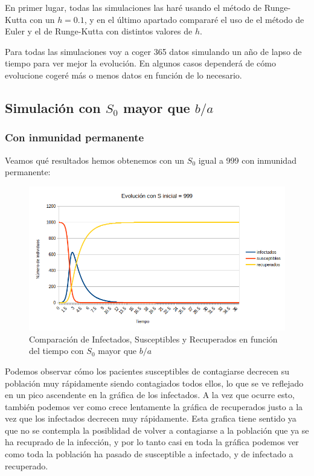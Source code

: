 \documentclass[11pt,a4paper]{report}
\begin{document}
En primer lugar, todas las simulaciones las haré usando el método de Runge-Kutta con un $h=0.1$, y en el último apartado compararé el uso de el método de Euler y el de Runge-Kutta con distintos valores de $h$.

Para todas las simulaciones voy a coger 365 datos simulando un año de lapso de tiempo para ver mejor la evolución. En algunos casos dependerá de cómo evolucione cogeré más o menos datos en función de lo necesario.

\newpage
\subsection{Simulación con $S_0$ mayor que $b/a$}
\subsubsection{Con inmunidad permanente}

Veamos qué resultados hemos obtenemos con un $S_0$ igual a 999 con inmunidad permanente:

\begin{figure}[H]
\centering
\includegraphics[width=\textwidth]{img/inmunidad/simulacion_ba_mayor.png}
\caption{Comparación de Infectados, Susceptibles y Recuperados en función del tiempo con $S_0$ mayor que $b/a$}
\label{}
\end{figure}

Podemos observar cómo los pacientes susceptibles de contagiarse decrecen su población muy rápidamente siendo contagiados todos ellos, lo que se ve reflejado en un pico ascendente en la gráfica de los infectados. A la vez que ocurre esto, también podemos ver como crece lentamente la gráfica de recuperados justo a la vez que los infectados decrecen muy rápidamente. Esta grafica tiene sentido ya que no se contempla la posiblidad de volver a contagiarse a la población que ya se ha recuprado de la infección, y por lo tanto casi en toda la gráfica podemos ver como toda la población ha pasado de susceptible a infectado, y de infectado a recuperado.
\end{document}
